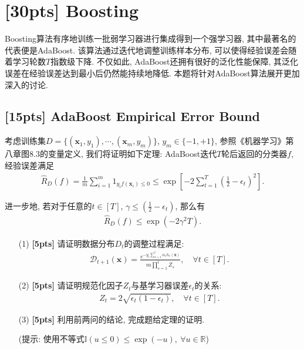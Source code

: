 \documentclass[a4paper,UTF8]{article}
\numberwithin{equation}{section}
\theoremstyle{definition}
\def \x {\boldsymbol{x}}
\begin{document}
\newpage

\section{[30pts] Boosting}
Boosting算法有序地训练一批弱学习器进行集成得到一个强学习器, 其中最著名的代表便是AdaBoost.
该算法通过迭代地调整训练样本分布, 可以使得经验误差会随着学习轮数$T$指数级下降. 不仅如此, AdaBoost还拥有很好的泛化性能保障,
其泛化误差在经验误差达到最小后仍然能持续地降低. 本题将针对AdaBoost算法展开更加深入的讨论.
\subsection{[15pts] AdaBoost Empirical Error Bound}

考虑训练集$D = \{(\x_1, y_1), \cdots, (\x_m, y_m)\}$, $y_m \in \{-1, +1\}$, 
参照《机器学习》第八章图8.3的变量定义, 我们将证明如下定理: AdaBoost迭代$T$轮后返回的分类器$f$, 经验误差满足
\begin{align*}
    \hat R_{D}(f) = \frac{1}{m} \sum_{i=1}^m 1_{y_i f(\x_i) \leq 0} \leq \exp\left[-2 \sum_{t=1}^T \left(\frac12 - \epsilon_t\right)^2\right].
\end{align*}

进一步地, 若对于任意的$t \in [T]$, $\gamma \leq (\frac12 - \epsilon_t)$, 那么有
\begin{align*}
    \hat R_{D}(f) \leq \exp(-2\gamma^2 T).
\end{align*}

\begin{enumerate}
    \item[(1)] \textbf{[5pts]} 请证明数据分布$D_t$的调整过程满足: 
    \begin{align*}
        \mathcal{D}_{t+1}(\x) = \frac{e^{-y_i \sum_{s=1}^t \alpha_s h_s(\x)}}{m \prod_{s=1}^t Z_s}, \quad \forall t \in [T].
    \end{align*}

    \item[(2)] \textbf{[5pts]} 请证明规范化因子$Z_t$与基学习器误差$\epsilon_t$的关系: 
    \begin{align*}
        Z_t = 2 \sqrt{\epsilon_t(1-\epsilon_t)}, \quad \forall t \in [T].
    \end{align*}

    \item[(3)] \textbf{[5pts]} 利用前两问的结论, 完成题给定理的证明.

    (提示: 使用不等式$\mathbb{I}(u\leq 0) \leq \exp{(-u)}, \ \forall u \in \mathbb{R}$)

\end{enumerate}
\end{document}
